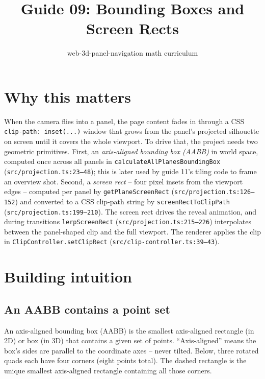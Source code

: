 \documentclass{article}
\title{Guide 09: Bounding Boxes and Screen Rects}
\author{web-3d-panel-navigation math curriculum}
\date{}
\begin{document}
\maketitle

\section{Why this matters}

When the camera flies into a panel, the page content fades in through a CSS
\texttt{clip-path: inset(...)} window that grows from the panel's projected silhouette
on screen until it covers the whole viewport. To drive that, the project needs two
geometric primitives. First, an \emph{axis-aligned bounding box (AABB)} in world space,
computed once across all panels in
\texttt{calculateAllPlanesBoundingBox} (\texttt{src/projection.ts:23--48}); this is later
used by guide 11's tiling code to frame an overview shot. Second, a
\emph{screen rect} -- four pixel insets from the viewport edges -- computed per panel by
\texttt{getPlaneScreenRect} (\texttt{src/projection.ts:126--152}) and converted to a CSS
clip-path string by \texttt{screenRectToClipPath} (\texttt{src/projection.ts:199--210}).
The screen rect drives the reveal animation, and during transitions
\texttt{lerpScreenRect} (\texttt{src/projection.ts:215--226}) interpolates between
the panel-shaped clip and the full viewport. The renderer applies the clip in
\texttt{ClipController.setClipRect} (\texttt{src/clip-controller.ts:39--43}).

\section{Building intuition}

\subsection{An AABB contains a point set}

An axis-aligned bounding box (AABB) is the smallest axis-aligned rectangle (in 2D) or box
(in 3D) that contains a given set of points. ``Axis-aligned'' means the box's sides are
parallel to the coordinate axes -- never tilted. Below, three rotated quads each have four
corners (eight points total). The dashed rectangle is the unique smallest axis-aligned
rectangle containing all those corners.
\end{document}
